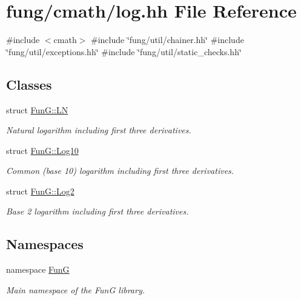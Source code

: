 \hypertarget{log_8hh}{\section{fung/cmath/log.hh \-File \-Reference}
\label{log_8hh}
}
{\ttfamily \#include $<$cmath$>$}\*
{\ttfamily \#include \char`\"{}fung/util/chainer.\-hh\char`\"{}}\*
{\ttfamily \#include \char`\"{}fung/util/exceptions.\-hh\char`\"{}}\*
{\ttfamily \#include \char`\"{}fung/util/static\-\_\-checks.\-hh\char`\"{}}\*
\subsection*{\-Classes}
\begin{DoxyCompactItemize}
\item 
struct \hyperlink{structFunG_1_1LN}{\-Fun\-G\-::\-L\-N}
\begin{DoxyCompactList}\small\item\em \-Natural logarithm including first three derivatives. \end{DoxyCompactList}\item 
struct \hyperlink{structFunG_1_1Log10}{\-Fun\-G\-::\-Log10}
\begin{DoxyCompactList}\small\item\em \-Common (base 10) logarithm including first three derivatives. \end{DoxyCompactList}\item 
struct \hyperlink{structFunG_1_1Log2}{\-Fun\-G\-::\-Log2}
\begin{DoxyCompactList}\small\item\em \-Base 2 logarithm including first three derivatives. \end{DoxyCompactList}\end{DoxyCompactItemize}
\subsection*{\-Namespaces}
\begin{DoxyCompactItemize}
\item 
namespace \hyperlink{namespaceFunG}{\-Fun\-G}
\begin{DoxyCompactList}\small\item\em \-Main namespace of the \-Fun\-G library. \end{DoxyCompactList}\end{DoxyCompactItemize}

